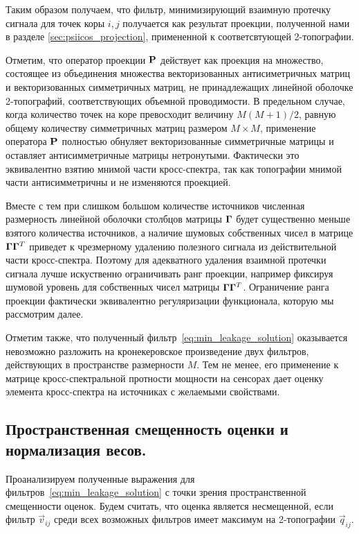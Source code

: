 Таким образом получаем, что фильтр, минимизирующий взаимную протечку сигнала
для точек коры $i, j$ получается как результат проекции, полученной нами в
разделе \ref{sec:psiicos_projection}, примененной к соответсвтующей
2-топографии.

Отметим, что оператор проекции $\mathbf{P}$ действует как проекция на множество,
состоящее из объединения множества векторизованных антисиметричных матриц и
векторизованных симметричных матриц, не принадлежащих линейной оболочке
2-топографий, соответствующих объемной проводимости. В предельном случае, когда
количество точек на коре превосходит величину $M (M + 1) / 2$, равную общему
количеству симметричных матриц размером $M \times M$, применение оператора
$\mathbf{P}$ полностью обнуляет векторизованные симметричные матрицы и оставляет
антисимметричные матрицы нетронутыми. Фактически это эквивалентно взятию
мнимой части кросс-спектра, так как топографии мнимой части антисимметричны и
не изменяются проекцией.

Вместе с тем при слишком большом количестве источников численная размерность
линейной оболочки столбцов матрицы $\mathbf{\Gamma}$ будет существенно меньше
взятого количества источников, а наличие шумовых собственных чисел в матрице
$\mathbf{\Gamma} \mathbf{\Gamma}^T$ приведет к чрезмерному удалению полезного
сигнала из действительной части кросс-спектра. Поэтому для адекватного удаления
взаимной протечки сигнала лучше искуственно ограничивать ранг проекции,
например фиксируя шумовой уровень для собственных чисел матрицы $\mathbf{\Gamma}
\mathbf{\Gamma}^T$. Ограничение ранга проекции фактически эквивалентно
регуляризации функционала, которую мы рассмотрим далее.

Отметим также, что полученный фильтр~\ref{eq:min_leakage_solution} оказывается
невозможно разложить на кронекеровское произведение двух фильтров, действующих
в пространстве размерности $M$. Тем не менее, его применение к матрице
кросс-спектральной протности мощности на сенсорах дает оценку элемента кросс-спектра на
источниках с желаемыми свойствами.

\subsection{Пространственная смещенность оценки и нормализация весов.}\label{subsec:psiicos_normalization_and_spatial_bias}

Проанализируем полученные выражения для фильтров~\ref{eq:min_leakage_solution}
с точки зрения пространственной смещенности оценок. Будем считать, что оценка
является несмещенной, если фильтр $\vec{v}_{ij}$ среди всех возможных фильтров
имеет максимум на 2-топографии $\vec{q}_{ij}$. 

